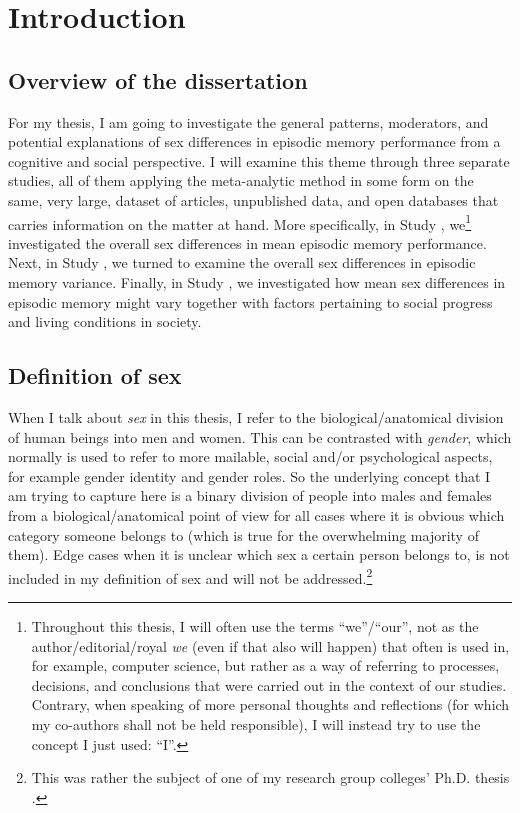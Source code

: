 \section{Introduction}

\subsection{Overview of the dissertation} For my thesis, I am going to investigate the general patterns, moderators, and potential explanations of sex differences in episodic memory performance from a cognitive and social perspective. I will examine this theme through three separate studies, all of them applying the meta-analytic method in some form on the same, very large, dataset of articles, unpublished data, and open databases that carries information on the matter at hand. More specifically, in Study  \parencite{Asperholm2019}, we\footnote{Throughout this thesis, I will often use the terms ``we''/``our'', not as the author/editorial/royal \emph{we} (even if that also will happen) that often is used in, for example, computer science, but rather as a way of referring to processes, decisions, and conclusions that were carried out in the context of our studies. Contrary, when speaking of more personal thoughts and reflections (for which my co-authors shall not be held responsible), I will instead try to use the concept I just used: ``I''.} investigated the overall sex differences in mean episodic memory performance. Next, in Study  \parencite{Asperholm2020}, we turned to examine the overall sex differences in episodic memory variance. Finally, in Study  \parencite{Asperholm2019b}, we investigated how mean sex differences in episodic memory might vary together with factors pertaining to social progress and living conditions in society.

\subsection{Definition of sex}

When I talk about \emph{sex} in this thesis, I refer to the biological/anatomical division of human beings into men and women. This can be contrasted with \emph{gender}, which normally is used to refer to more mailable, social and/or psychological aspects, for example gender identity and gender roles. So the underlying concept that I am trying to capture here is a binary division of people into males and females from a biological/anatomical point of view for all cases where it is obvious which category someone belongs to (which is true for the overwhelming majority of them). Edge cases when it is unclear which sex a certain person belongs to, is not included in my definition of sex and will not be addressed.\footnote{This was rather the subject of one of my research group colleges' Ph.D. thesis \parencite{Strandqvist2018b}.}

